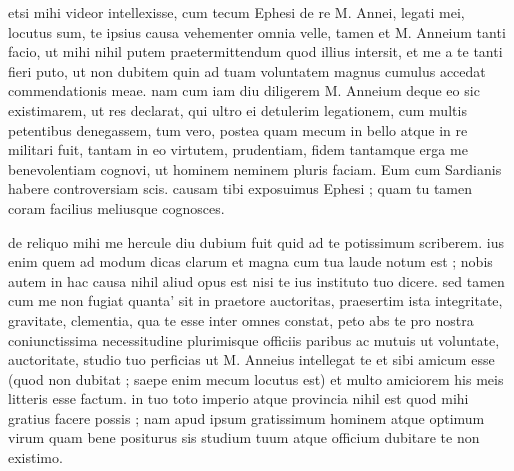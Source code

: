 


 etsi mihi videor intellexisse, cum tecum Ephesi de re M. Annei, legati mei, locutus sum, te ipsius causa vehementer omnia velle, tamen et M. Anneium tanti facio, ut mihi nihil putem praetermittendum quod illius intersit, et me a te tanti fieri puto, ut non dubitem quin ad tuam voluntatem magnus cumulus accedat commendationis meae. nam cum iam diu diligerem M. Anneium deque eo sic existimarem, ut res declarat, qui ultro ei detulerim legationem, cum multis petentibus denegassem, tum vero, postea quam mecum in bello atque in re militari fuit, tantam in eo virtutem, prudentiam, fidem tantamque erga me benevolentiam cognovi, ut hominem neminem pluris faciam. Eum cum Sardianis habere controversiam scis. causam tibi exposuimus Ephesi ; quam tu tamen coram facilius meliusque cognosces.

 de reliquo mihi me hercule diu dubium fuit quid ad te potissimum scriberem. ius enim quem ad modum dicas clarum et magna cum tua laude notum est ; nobis autem in hac causa nihil aliud opus est nisi te ius instituto tuo dicere. sed tamen cum me non fugiat quanta' sit in praetore auctoritas, praesertim ista integritate, gravitate, clementia, qua te esse inter omnes constat, peto abs te pro nostra coniunctissima necessitudine plurimisque officiis paribus ac mutuis ut voluntate, auctoritate, studio tuo perficias ut M. Anneius intellegat te et sibi amicum esse (quod non dubitat ; saepe enim mecum locutus est) et multo amiciorem his meis litteris esse factum. in tuo toto imperio atque provincia nihil est quod mihi gratius facere possis ; nam apud ipsum gratissimum hominem atque optimum virum quam bene positurus sis studium tuum atque officium dubitare te non existimo.

